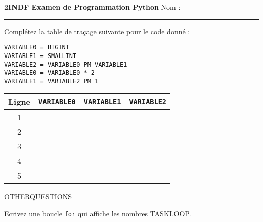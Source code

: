 \documentclass[12pt]{exam}
\begin{document}
\begin{center}
\textbf{2INDF Examen de Programmation Python} \hfill Nom : \rule{6cm}{0.4pt}
\end{center}

\begin{questions}

\question[5] Complétez la table de traçage suivante pour le code donné :

\hfill
\begin{minipage}[t]{0.2\textwidth}
\vspace{0mm}
\begin{lstlisting}
VARIABLE0 = BIGINT
VARIABLE1 = SMALLINT
VARIABLE2 = VARIABLE0 PM VARIABLE1
VARIABLE0 = VARIABLE0 * 2
VARIABLE1 = VARIABLE2 PM 1
\end{lstlisting}
\end{minipage}
\hfill
\begin{minipage}[t]{0.4\textwidth}
\vspace{-4mm}
    \begin{tabular}{|c|p{5mm}|p{5mm}|p{5mm}|}
        \hline
        {\footnotesize Ligne} & \texttt{VARIABLE0} & \texttt{VARIABLE1} & \texttt{VARIABLE2} \\
        \hline
        1 &  &  &  \\
        \hline
        2 &  &  &  \\
        \hline
        3 &  &  &  \\
        \hline
        4 &  &  &  \\
        \hline
        5 &  &  &  \\
        \hline
    \end{tabular}
\end{minipage}

OTHERQUESTIONS

\question[5] Ecrivez une boucle \texttt{for} qui affiche les nombres TASKLOOP.
\fillwithgrid{18mm}

\end{questions}
\end{document}
